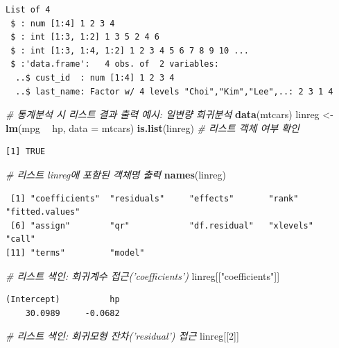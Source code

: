 \documentclass[11pt,a4paper]{book}
\newenvironment{Shaded}{\begin{snugshade}}{\end{snugshade}}
\newcommand{\KeywordTok}[1]{\textcolor[rgb]{0.13,0.29,0.53}{\textbf{#1}}}
\newcommand{\DataTypeTok}[1]{\textcolor[rgb]{0.13,0.29,0.53}{#1}}
\newcommand{\DecValTok}[1]{\textcolor[rgb]{0.00,0.00,0.81}{#1}}
\newcommand{\StringTok}[1]{\textcolor[rgb]{0.31,0.60,0.02}{#1}}
\newcommand{\CommentTok}[1]{\textcolor[rgb]{0.56,0.35,0.01}{\textit{#1}}}
\newcommand{\OperatorTok}[1]{\textcolor[rgb]{0.81,0.36,0.00}{\textbf{#1}}}
\newcommand{\NormalTok}[1]{#1}
\theoremstyle{definition}
\theoremstyle{definition}
\theoremstyle{definition}
\theoremstyle{remark}
\begin{document}
\begin{verbatim}
List of 4
 $ : num [1:4] 1 2 3 4
 $ : int [1:3, 1:2] 1 3 5 2 4 6
 $ : int [1:3, 1:4, 1:2] 1 2 3 4 5 6 7 8 9 10 ...
 $ :'data.frame':   4 obs. of  2 variables:
  ..$ cust_id  : num [1:4] 1 2 3 4
  ..$ last_name: Factor w/ 4 levels "Choi","Kim","Lee",..: 2 3 1 4
\end{verbatim}

\begin{Shaded}
\begin{Highlighting}[]
\CommentTok{# 통계분석 시 리스트 결과 출력 예시: 일변량 회귀분석}
\KeywordTok{data}\NormalTok{(mtcars)}
\NormalTok{linreg <-}\StringTok{ }\KeywordTok{lm}\NormalTok{(mpg }\OperatorTok{~}\StringTok{ }\NormalTok{hp, }\DataTypeTok{data =}\NormalTok{ mtcars)}
\KeywordTok{is.list}\NormalTok{(linreg)  }\CommentTok{# 리스트 객체 여부 확인}
\end{Highlighting}
\end{Shaded}

\begin{verbatim}
[1] TRUE
\end{verbatim}

\begin{Shaded}
\begin{Highlighting}[]
\CommentTok{# 리스트 linreg에 포함된 객체명 출력}
\KeywordTok{names}\NormalTok{(linreg)}
\end{Highlighting}
\end{Shaded}

\begin{verbatim}
 [1] "coefficients"  "residuals"     "effects"       "rank"          "fitted.values"
 [6] "assign"        "qr"            "df.residual"   "xlevels"       "call"         
[11] "terms"         "model"        
\end{verbatim}

\begin{Shaded}
\begin{Highlighting}[]
\CommentTok{# 리스트 색인: 회귀계수 접근('coefficients')}
\NormalTok{linreg[[}\StringTok{"coefficients"}\NormalTok{]]}
\end{Highlighting}
\end{Shaded}

\begin{verbatim}
(Intercept)          hp 
    30.0989     -0.0682 
\end{verbatim}

\begin{Shaded}
\begin{Highlighting}[]
\CommentTok{# 리스트 색인: 회귀모형 잔차('residual') 접근}
\NormalTok{linreg[[}\DecValTok{2}\NormalTok{]]}
\end{Highlighting}
\end{Shaded}
\end{document}
